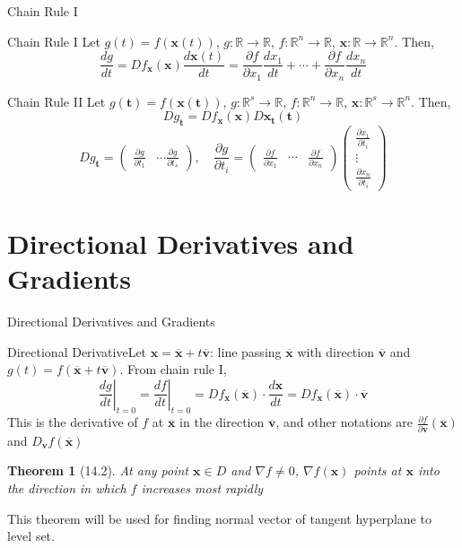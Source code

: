 \documentclass[final]{beamer}
\newtheorem{thm}{Theorem}
\newcommand{\bb}{\mathbb}
\newcommand{\bd}{\mathbf}
\newcommand{\p}{\partial}
\begin{document}
\begin{frame}[t]{Chain Rule I}
	\begin{block}
		{Chain Rule I}
		Let $g(t)=f(\bd{x}(t))$, $g:\bb{R}\rightarrow\bb{R}$, $f:\bb{R}^n\rightarrow\bb{R}$, $\bd x :\bb{R}\rightarrow\bb{R}^n$. Then, \[
			\frac{d g}{dt} = Df_{\bd x}(\bd x) \frac {d\bd x(t)}{dt} = \frac{\p f}{\p x_1}\frac{dx_1}{dt}+ \cdots +\frac{\p f}{\p x_n}\frac{dx_n}{dt}
		\]
	\end{block}
	\begin{block}
		{Chain Rule II}
		Let $g(\bd t)=f(\bd{x}(\bd t))$, $g:\bb{R}^s\rightarrow\bb{R}$, $f:\bb{R}^n\rightarrow\bb{R}$, $\bd x :\bb{R}^s\rightarrow\bb{R}^n$. Then, \[
			Dg_{\bd t} = Df_{\bd x}(\bd x) D {\bd x_{\bd t}(\bd t)}
			\]\[
				Dg_{\bd t}=\begin{pmatrix}
					\frac{\p g}{\p t_1} & \cdots \frac{\p g}{\p t_s}
				\end{pmatrix},\quad\frac{\p g}{\p t_i} = \begin{pmatrix}
					\frac{\p f}{\p x_1} & \cdots & \frac{\p f}{\p x_n}
				\end{pmatrix}\begin{pmatrix}
					\frac{\p x_1 }{\p t_i}\\
					\vdots\\
					\frac{\p x_n }{\p t_i}
				\end{pmatrix}
			\]
	\end{block}
\end{frame}
\section{Directional Derivatives and Gradients} %
\label{sec:directional_derivatives_and_gradients}
\begin{frame}[t]{Directional Derivatives and Gradients}
	\begin{block}
		{Directional Derivative}Let $\bd x = \overline{\bd x} + t \overline{\bd v}$: line passing $\overline{\bd x}$ with direction $\overline{\bd v}$ and $g(t) = f(\overline{\bd x} + t \overline{\bd v})$. From chain rule I, \[
			\left.\frac{dg}{dt}\right\vert_{t=0} = \left.\frac{df}{dt}\right\vert_{t=0}= Df_{\bd x} (\overline{\bd x}) \cdot \frac{d\bd x}{dt} = Df_{\bd x} (\overline{\bd x})\cdot\overline{\bd v}
		\]This is the derivative of $f$ at $\overline{\bd x}$ in the direction $\overline{\bd v}$, and other notations are $\frac{\p f}{\p \bd v}(\overline{\bd x})$ and $D_{\bd v}f(\overline{\bd x})$
	\end{block}
	\begin{thm}
		[14.2] At any point $\bd x\in D$ and $\nabla f \neq 0$, $\nabla f(\bd x)$ points at $\bd x$ into the direction in which $f$ increases most rapidly
	\end{thm}
	This theorem will be used for finding normal vector of tangent hyperplane to level set.
\end{frame}
\end{document}
